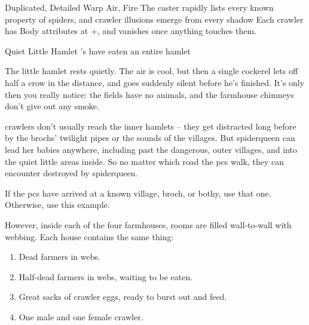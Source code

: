 

  {Duplicated, Detailed}%
  {Warp}%
  {Air, Fire}%
  {}%
  {The caster rapidly lists every known property of spiders, and  \gls{crawler} illusions emerge from every shadow}%
  {Each \gls{crawler} has Body \glspl{attribute} at +, and vanishes once anything touches them.}

{Quiet Little Hamlet}%
{'s  have eaten an entire hamlet}%

\begin{boxtext}
  The little hamlet rests quietly.
  The air is cool, but then a single cockerel lets off half a crow in the distance, and goes suddenly silent before he's finished.
  It's only then you really notice: the fields have no animals, and the farmhouse chimneys don't give out any smoke.
\end{boxtext}

\Glspl{crawler} don't usually reach the inner hamlets -- they get distracted long before by the \glspl{broch}' twilight pipes or the sounds of the \glspl{village}.
But \gls{spiderqueen} can lead her babies anywhere, including past the dangerous, outer \glspl{village}, and into the quiet little areas inside.
So no matter which road the \glspl{pc} walk, they can encounter  destroyed by \gls{spiderqueen}.

If the \glspl{pc} have arrived at a known \gls{village}, \gls{broch}, or \gls{bothy}, use that one.
Otherwise, use this example.

However, inside each of the four farmhouses, rooms are filled wall-to-wall with webbing.  Each house contains the same thing:

\begin{enumerate}
  \item
  Dead farmers in webs.
  \item
  Half-dead farmers in webs, waiting to be eaten.
  \item
  Great sacks of \gls{crawler} eggs, ready to burst out and feed.
  \item
    One male and one female \gls{crawler}.
\end{enumerate}

